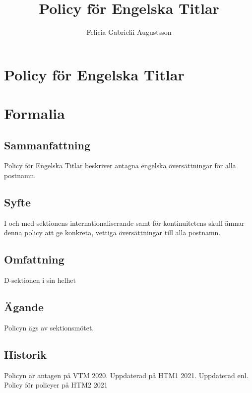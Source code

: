 \documentclass{dsekkallelse}
\title{Policy för Engelska Titlar}
\author{Felicia Gabrielii Augustsson}
\begin{document}
\section{Policy för Engelska Titlar}
\section{Formalia}
\subsection{Sammanfattning}
Policy för Engelska Titlar beskriver antagna engelska översättningar för alla postnamn.
\subsection{Syfte}
I och med sektionens internationaliserande samt för kontinuitetens skull ämnar denna policy att ge konkreta, vettiga översättningar till alla postnamn.
\subsection{Omfattning}
D-sektionen i sin helhet
\subsection{Ägande}
Policyn ägs av sektionsmötet.

\subsection{Historik}
Policyn är antagen på VTM 2020.
Uppdaterad på HTM1 2021.
Uppdaterad enl. Policy för policyer på HTM2 2021
\end{document}
